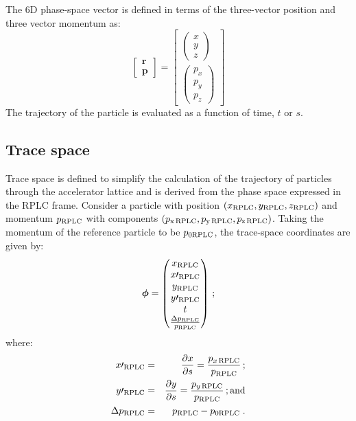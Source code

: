 The 6D phase-space vector is defined in terms of the three-vector
position and three vector momentum as:
\begin{equation}
  \begin{bmatrix} \bm{r} \\ \bm{p} \end{bmatrix} = 
  \begin{bmatrix} \begin{pmatrix} x   \\   y \\ z   \end{pmatrix} \\
                  \begin{pmatrix} p_x \\ p_y \\ p_z \end{pmatrix} \end{bmatrix}
\end{equation}
The trajectory of the particle is evaluated as a function of time,
$t$ or $s$.

\subsection{Trace space}

Trace space is defined to simplify the calculation of the trajectory
of particles through the accelerator lattice and is derived from the
phase space expressed in the RPLC frame.
Consider a particle with position
$(x_{\rm RPLC}, y_{\rm RPLC}, z_{\rm RPLC})$ and momentum 
$p_{\rm RPLC}$ with components
$(p_{\rm x\,RPLC}, p_{\rm y\,RPLC}, p_{\rm z\,RPLC})$.
Taking the momentum of the reference particle to be
$p_{0 {\rm RPLC}}$, the trace-space coordinates are given by:
\begin{equation}
    \bm{\phi} = \begin{pmatrix}
                  x_{\rm RPLC}       \\
                  x\prime_{\rm RPLC} \\
                  y_{\rm RPLC}       \\
                  y\prime_{\rm RPLC} \\
                  t                 \\
                  \frac{\Delta p_{\rm RPLC}}{p_{\rm RPLC}}
                \end{pmatrix} \, ;
\end{equation}
where:
\begin{eqnarray}
  x\prime_{\rm RPLC}  & = & \frac{\partial x}{\partial s} = \frac{p_{x\,{\rm RPLC}}}{p_{\rm RPLC}} \, ; \\
  y\prime_{\rm RPLC}  & = & \frac{\partial y}{\partial s} = \frac{p_{y\,{\rm RPLC}}}{p_{\rm RPLC}} \, {\rm ; and}\\
  \Delta p_{\rm RPLC} & = & p_{\rm RPLC} - p_{0 {\rm RPLC}} \; .
\end{eqnarray}

